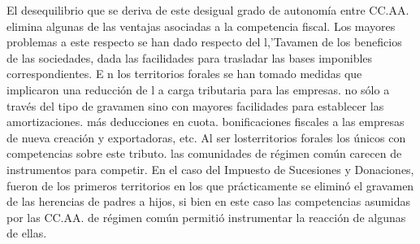 \documentclass[10pt,a4paper]{article}
\begin{document}
El desequilibrio que se deriva de este desigual grado de autonomía entre CC.AA. elimina algunas de las ventajas asociadas a la competencia fiscal. Los mayores problemas a este respecto se han dado respecto del l,'Tavamen de los beneficios de las sociedades, dada las facilidades para trasladar las bases imponibles correspondientes. E n los territorios forales se han tomado medidas que implicaron una reducción de l a carga tributaria para las empresas. no sólo a través del tipo de gravamen sino con mayores facilidades para establecer las amortizaciones. más deducciones en cuota. bonificaciones fiscales a las empresas de nueva creación y exportadoras, etc. Al ser losterritorios forales los únicos con competencias sobre este tributo. las comunidades de régimen común carecen de instrumentos para competir. En el caso del Impuesto de Sucesiones y Donaciones, fueron de los primeros territorios en los que prácticamente se eliminó el gravamen de las herencias de padres a hijos, si bien en este caso las competencias asumidas por las CC.AA. de régimen común permitió instrumentar la reacción de algunas de ellas.
\end{document}
